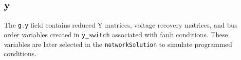 
\subsection{y}  
The \verb|g.y| field contains reduced Y matrices, voltage recovery matrices, and bus order variables created in \verb|y_switch| associated with fault conditions.
These variables are later selected in the \verb|networkSolution| to simulate programmed conditions.

\begin{comment}

template for subparagraphs

\subsection{xxx} %
\begin{verbatim}

\end{verbatim}

\end{comment}